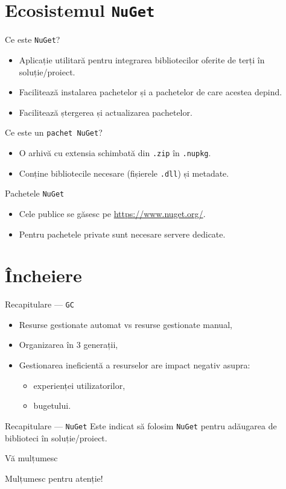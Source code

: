 \documentclass[presentation]{beamer}
\begin{document}
\section{Ecosistemul \texttt{NuGet}}
\label{sec:org2a24cf9}
\begin{frame}[label={sec:orgaeb52c6},fragile]{Ce este \texttt{NuGet}?}
 \begin{itemize}
\item Aplicație utilitară pentru integrarea bibliotecilor oferite de terți în soluție/proiect.
\item Facilitează instalarea pachetelor și a pachetelor de care acestea depind.
\item Facilitează ștergerea și actualizarea pachetelor.
\end{itemize}
\end{frame}
\begin{frame}[label={sec:orga3b537c},fragile]{Ce este un \texttt{pachet NuGet}?}
 \begin{itemize}
\item O arhivă cu extensia schimbată din \texttt{.zip} în \texttt{.nupkg}.
\item Conține bibliotecile necesare (fișierele \texttt{.dll}) și metadate.
\end{itemize}
\end{frame}
\begin{frame}[label={sec:orge23e6d3},fragile]{Pachetele \texttt{NuGet}}
 \begin{itemize}
\item Cele publice se găsesc pe \url{https://www.nuget.org/}.
\item Pentru pachetele private sunt necesare servere dedicate.
\end{itemize}
\end{frame}
\section{Încheiere}
\label{sec:org331ed18}
\begin{frame}[label={sec:orgcecb14e},fragile]{Recapitulare --- \texttt{GC}}
 \begin{itemize}
\item Resurse gestionate automat vs resurse gestionate manual,
\item Organizarea în 3 generații,
\item Gestionarea ineficientă a resurselor are impact negativ asupra:
\begin{itemize}
\item experienței utilizatorilor,
\item bugetului.
\end{itemize}
\end{itemize}
\end{frame}
\begin{frame}[label={sec:org09cf003},fragile]{Recapitulare --- \texttt{NuGet}}
 Este indicat să folosim \texttt{NuGet} pentru adăugarea de biblioteci în soluție/proiect.
\end{frame}
\begin{frame}[label={sec:org4cd2f23}]{Vă mulțumesc}
\begin{center}
Mulțumesc pentru atenție!
\end{center}
\end{frame}
\end{document}
